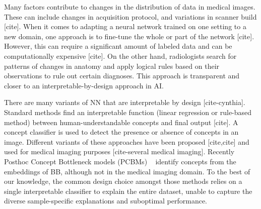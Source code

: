 Many factors contribute to changes in the distribution of data in medical images. These can include changes in acquisition protocol, and variations in scanner build [cite]. When it comes to adapting a neural network trained on one setting to a new domain, one approach is to fine-tune the whole or part of the network [cite]. However, this can require a significant amount of labeled data and can be computationally expensive [cite]. On the other hand, radiologists search for patterns of changes in anatomy and apply logical rules based on their observations to rule out certain diagnoses. This approach is transparent and closer to an interpretable-by-design approach in AI.



There are many variants of NN that are interpretable by design [cite-cynthia]. Standard methods find an interpretable function (\eg linear regression or rule-based method) between human-understandable concepts and final output [cite]. A concept classifier is used to detect the presence or absence of concepts in an image. Different variants of these approaches have been proposed [cite,cite] and used for medical imaging purposes [cite-several medical imaging]. Recently Posthoc Concept Bottleneck models (PCBMs) ~\cite{yuksekgonul2022post} identify concepts from the embeddings of BB, although not in the medical imaging domain. To the best of our knowledge, the common design choice amongst those methods relies on a single interpretable classifier to explain the entire dataset, unable to capture the diverse sample-specific explanations and suboptimal performance. 

